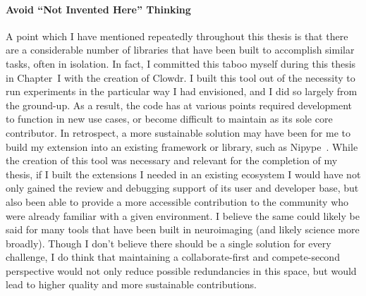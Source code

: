 \paragraph*{Avoid ``Not Invented Here'' Thinking}
A point which I have mentioned repeatedly throughout this thesis is that there are a considerable number of
libraries that have been built to accomplish similar tasks, often in isolation. In fact, I committed this taboo
myself during this thesis in Chapter~I with the creation of Clowdr. I built this tool out of the necessity to run
experiments in the particular way I had envisioned, and I did so largely from the ground-up. As a result, the code
has at various points required development to function in new use cases, or become difficult to maintain as its sole
core contributor. In retrospect, a more sustainable solution may have been for me to build my extension into an
existing framework or library, such as Nipype~\cite{gorgolewski2011nipype}. While the creation of this tool was
necessary and relevant for the completion of my thesis, if I built the extensions I needed in an existing ecosystem I
would have not only gained the review and debugging support of its user and developer base, but also been able to
provide a more accessible contribution to the community who were already familiar with a given environment. I believe
the same could likely be said for many tools that have been built in neuroimaging (and likely science more broadly).
Though I don't believe there should be a single solution for every challenge, I do think that maintaining a
collaborate-first and compete-second perspective would not only reduce possible redundancies in this space, but would
lead to higher quality and more sustainable contributions.

